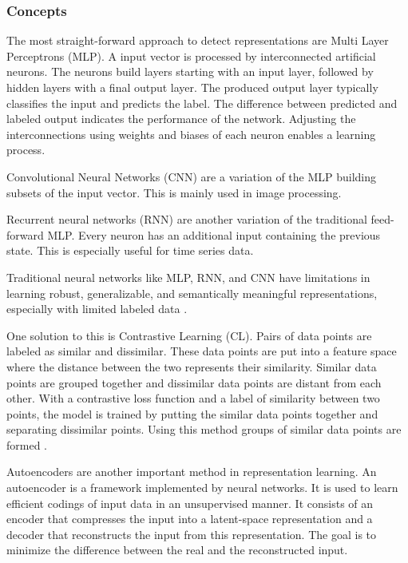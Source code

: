 \subsubsection{Concepts}
The most straight-forward approach to detect representations are Multi Layer Perceptrons (MLP). A input vector is processed by interconnected artificial neurons. The neurons build layers starting with an input layer, followed by hidden layers with a final output layer. The produced output layer typically classifies the input and predicts the label. The difference between predicted and labeled output indicates the performance of the network. Adjusting the interconnections using weights and biases of each neuron enables a learning process. 

Convolutional Neural Networks (CNN) are a variation of the MLP building subsets of the input vector. This is mainly used in image processing.

Recurrent neural networks (RNN) are another variation of the traditional feed-forward MLP. Every neuron has an additional input containing the previous state. This is especially useful for time series data.

Traditional neural networks like MLP, RNN, and CNN have limitations in learning robust, generalizable, and semantically meaningful representations, especially with limited labeled data .

One solution to this is Contrastive Learning (CL). Pairs of data points are labeled as similar and dissimilar. These data points are put into a feature space where the distance between the two represents their similarity. Similar data points are grouped together and dissimilar data points are distant from each other. With a contrastive loss function and a label of similarity between two points, the model is trained by putting the similar data points together and separating dissimilar points. Using this method groups of similar data points are formed .

Autoencoders are another important method in representation learning. An autoencoder is a framework implemented by neural networks. It is used to learn efficient codings of input data in an unsupervised manner. It consists of an encoder that compresses the input into a latent-space representation and a decoder that reconstructs the input from this representation. The goal is to minimize the difference between the real and the reconstructed input.

